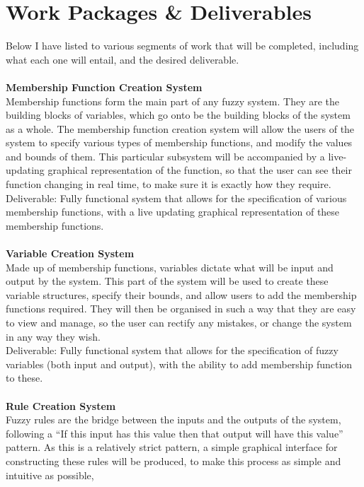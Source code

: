 \documentclass[a4paper,twoside,notitlepage,11pt]{article}
\begin{document}
\section{Work Packages \& Deliverables}
Below I have listed to various segments of work that will be completed, including what each one will entail, and the desired deliverable.\ \\
\ \\
\noindent
\textbf{Membership Function Creation System}\ \\
Membership functions form the main part of any fuzzy system. They are the building blocks of variables, which go onto be the building blocks of the system as a whole. The membership function creation system will allow the users of the system to specify various types of membership functions, and modify the values and bounds of them. This particular subsystem will be accompanied by a live-updating graphical representation of the function, so that the user can see their function changing in real time, to make sure it is exactly how they require.
\ \\
Deliverable: Fully functional system that allows for the specification of various membership functions, with a live updating graphical representation of these membership functions.\ \\
\ \\
\noindent
\textbf{Variable  Creation System}\ \\
Made up of membership functions, variables dictate what will be input and output by the system. This part of the system will be used to create these variable structures, specify their bounds, and allow users to add the membership functions required. They will then be organised in such a way that they are easy to view and manage, so the user can rectify any mistakes, or change the system in any way they wish. 
\ \\
Deliverable: Fully functional system that allows for the specification of fuzzy variables (both input and output), with the ability to add membership function to these.\ \\
\ \\
\noindent
\textbf{Rule Creation System}\ \\
Fuzzy rules are the bridge between the inputs and the outputs of the system, following a ``If this input has this value then that output will have this value'' pattern. As this is a relatively strict pattern, a simple graphical interface for constructing these rules will be produced, to make this process as simple and intuitive as possible,
\end{document}
